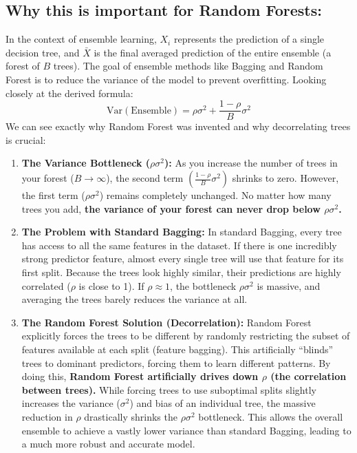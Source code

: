 \documentclass[twoside, 10pt]{article}
\begin{document}
\subsection{Why this is important for Random Forests:}
In the context of ensemble learning, $X_i$ represents the prediction of a single decision tree, and $\bar{X}$ is the final averaged prediction of the entire ensemble (a forest of $B$ trees). The goal of ensemble methods like Bagging and Random Forest is to reduce the variance of the model to prevent overfitting.
Looking closely at the derived formula:
\[
\text{Var}(\text{Ensemble}) = \rho\sigma^2 + \frac{1 - \rho}{B}\sigma^2
\]
We can see exactly why Random Forest was invented and why decorrelating trees is crucial:
\begin{enumerate}
    \item \textbf{The Variance Bottleneck ($\rho\sigma^2$):} As you increase the number of trees in your forest ($B \to \infty$), the second term $\left(\frac{1-\rho}{B}\sigma^2\right)$ shrinks to zero. However, the first term ($\rho\sigma^2$) remains completely unchanged. No matter how many trees you add, \textbf{the variance of your forest can never drop below $\rho\sigma^2$.}
    \item \textbf{The Problem with Standard Bagging:} In standard Bagging, every tree has access to all the same features in the dataset. If there is one incredibly strong predictor feature, almost every single tree will use that feature for its first split. Because the trees look highly similar, their predictions are highly correlated ($\rho$ is close to 1). If $\rho \approx 1$, the bottleneck $\rho\sigma^2$ is massive, and averaging the trees barely reduces the variance at all.
    \item \textbf{The Random Forest Solution (Decorrelation):} Random Forest explicitly forces the trees to be different by randomly restricting the subset of features available at each split (feature bagging). This artificially ``blinds'' trees to dominant predictors, forcing them to learn different patterns.
    By doing this, \textbf{Random Forest artificially drives down $\rho$ (the correlation between trees).} While forcing trees to use suboptimal splits slightly increases the variance ($\sigma^2$) and bias of an individual tree, the massive reduction in $\rho$ drastically shrinks the $\rho\sigma^2$ bottleneck. This allows the overall ensemble to achieve a vastly lower variance than standard Bagging, leading to a much more robust and accurate model.
\end{enumerate}
\end{document}
